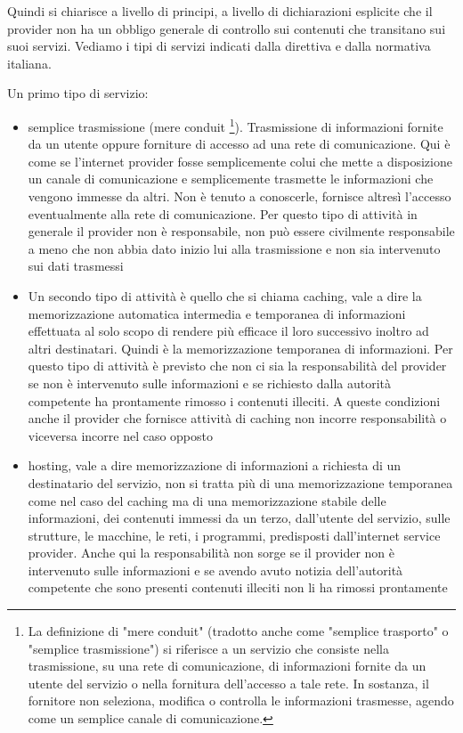 Quindi si chiarisce a livello di principi, a livello di dichiarazioni esplicite che il provider non ha un obbligo generale di controllo sui contenuti che transitano sui suoi servizi. 
Vediamo i tipi di servizi indicati dalla direttiva e dalla normativa italiana. 

Un primo tipo di servizio:

\begin{itemize}
    \item semplice trasmissione (mere conduit \footnote{La definizione di "mere conduit" (tradotto anche come "semplice trasporto" o "semplice trasmissione") si riferisce a un servizio che consiste nella trasmissione, su una rete di comunicazione, di informazioni fornite da un utente del servizio o nella fornitura dell'accesso a tale rete. In sostanza, il fornitore non seleziona, modifica o controlla le informazioni trasmesse, agendo come un semplice canale di comunicazione. }). Trasmissione di informazioni fornite da un utente oppure forniture di accesso ad una rete di comunicazione. Qui è come se l'internet provider fosse semplicemente colui che mette a disposizione un canale di comunicazione e semplicemente trasmette le informazioni che vengono immesse da altri. Non è tenuto a conoscerle, fornisce altresì l'accesso eventualmente alla rete di comunicazione. Per questo tipo di attività in generale il provider non è responsabile, non può essere civilmente responsabile a meno che non abbia dato inizio lui alla trasmissione e non sia intervenuto sui dati trasmessi 
    \item Un secondo tipo di attività è quello che si chiama caching, vale a dire la memorizzazione automatica intermedia e temporanea di informazioni effettuata al solo scopo di rendere più efficace il loro successivo inoltro ad altri destinatari. Quindi è la memorizzazione temporanea di informazioni. Per questo tipo di attività è previsto che non ci sia la responsabilità del provider se non è intervenuto sulle informazioni e se richiesto dalla autorità competente ha prontamente rimosso i contenuti illeciti. A queste condizioni anche il provider che fornisce attività di caching non incorre responsabilità o viceversa incorre nel caso opposto
    \item hosting, vale a dire memorizzazione di informazioni a richiesta di un destinatario del servizio, non si tratta più di una memorizzazione temporanea come nel caso del caching ma di una memorizzazione stabile delle informazioni, dei contenuti immessi da un terzo, dall'utente del servizio, sulle strutture, le macchine, le reti, i programmi, predisposti dall'internet service provider. Anche qui la responsabilità non sorge se il provider non è intervenuto sulle informazioni e se avendo avuto notizia dell'autorità competente che sono presenti contenuti illeciti non li ha rimossi prontamente
\end{itemize}


